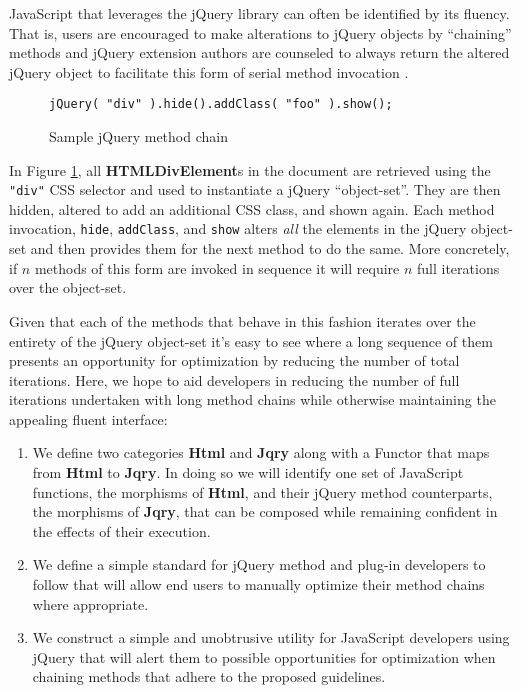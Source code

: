 \documentclass[preprint]{sigplanconf}
\begin{document}
JavaScript that leverages the jQuery library can often be identified by its fluency. That is, users are encouraged to make alterations to jQuery objects by ``chaining'' methods and jQuery extension authors are counseled to always return the altered jQuery object to facilitate this form of serial method invocation \cite{bib:chaining}.

\begin{figure}[!ht]
\small
\begin{verbatim}
jQuery( "div" ).hide().addClass( "foo" ).show();
\end{verbatim}
\nocaptionrule \caption{Sample jQuery method chain}
\label{fig:jquery-sample}
\end{figure}

In Figure \ref{fig:jquery-sample}, all \textbf{HTMLDivElement}s in the document are retrieved using the \verb|"div"| CSS selector and used to instantiate a jQuery ``object-set''. They are then hidden, altered to add an additional CSS class, and shown again. Each method invocation, \verb|hide|, \verb|addClass|, and \verb|show| alters \textit{all} the elements in the jQuery object-set and then provides them for the next method to do the same. More concretely, if \begin{math}n\end{math} methods of this form are invoked in sequence it will require \begin{math}n\end{math} full iterations over the object-set.

Given that each of the methods that behave in this fashion iterates over the entirety of the jQuery object-set it's easy to see where a long sequence of them presents an opportunity for optimization by reducing the number of total iterations. Here, we hope to aid developers in reducing the number of full iterations undertaken with long method chains while otherwise maintaining the appealing fluent interface:

\begin{enumerate}
\item We define two categories \textbf{Html} and \textbf{Jqry} along with a Functor that maps from \textbf{Html} to \textbf{Jqry}. In doing so we will identify one set of JavaScript functions, the morphisms of \textbf{Html}, and their jQuery method counterparts, the morphisms of \textbf{Jqry}, that can be composed while remaining confident in the effects of their execution.
\item We define a simple standard for jQuery method and plug-in developers to follow that will allow end users to manually optimize their method chains where appropriate.
\item We construct a simple and unobtrusive utility for JavaScript developers using jQuery that will alert them to possible opportunities for optimization when chaining methods that adhere to the proposed guidelines.
\end{enumerate}
\end{document}
